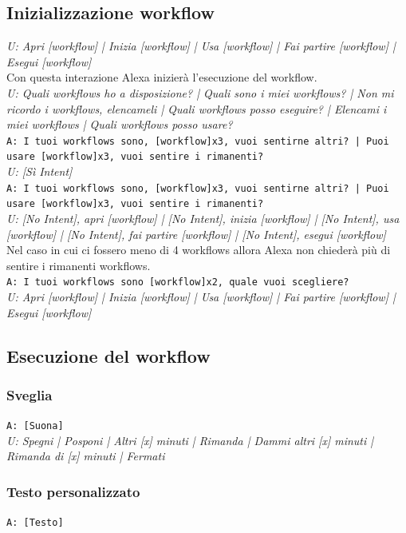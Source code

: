 \subsection{Inizializzazione workflow}
\textit{U: Apri [workflow] | Inizia [workflow] | Usa [workflow] | Fai partire [workflow] | Esegui [workflow]}\\
Con questa interazione Alexa inizierà l'esecuzione del workflow.\\
\textit{U: Quali workflows ho a disposizione? | Quali sono i miei workflows? | Non mi ricordo i workflows, elencameli | Quali workflows posso eseguire? | Elencami i miei workflows | Quali workflows posso usare?}\\
\texttt{A: I tuoi workflows sono, [workflow]x3, vuoi sentirne altri? | Puoi usare [workflow]x3, vuoi sentire i rimanenti?}\\
\textit{U: [Sì Intent]}\\
\texttt{A: I tuoi workflows sono, [workflow]x3, vuoi sentirne altri? | Puoi usare [workflow]x3, vuoi sentire i rimanenti?}\\
\textit{U: [No Intent], apri [workflow] | [No Intent], inizia [workflow] | [No Intent], usa [workflow] | [No Intent], fai partire [workflow] | [No Intent], esegui [workflow]}\\
Nel caso in cui ci fossero meno di 4 workflows allora Alexa non chiederà più di sentire i rimanenti workflows.\\
\texttt{A: I tuoi workflows sono [workflow]x2, quale vuoi scegliere?}\\
\textit{U: Apri [workflow] | Inizia [workflow] | Usa [workflow] | Fai partire [workflow] | Esegui [workflow]}\\

\subsection{Esecuzione del workflow}
\subsubsection{Sveglia}
\texttt{A: [Suona]}\\
\textit{U: Spegni | Posponi | Altri [x] minuti | Rimanda | Dammi altri [x] minuti | Rimanda di [x] minuti | Fermati}

\subsubsection{Testo personalizzato}
\texttt{A: [Testo]}

